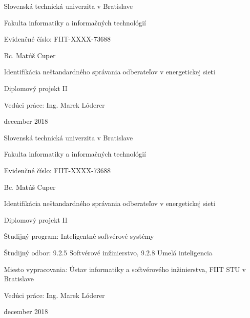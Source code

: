 \documentclass[a4paper,twoside,slovak,12pt,appendix]{article}
\begin{document}
\begin{titlepage}
	\centering
	{\Large Slovenská technická univerzita v Bratislave \par}
	{\Large Fakulta informatiky a informačných technológií \par}
  \vspace{0.5cm}
  {\normalsize Evidenčné číslo: FIIT-XXXX-73688 \par}
	\vspace{7cm}
  {\large Bc. Matúš Cuper \par}
  \vspace{0.5cm}
	{\LARGE Identifikácia neštandardného správania odberateľov v energetickej sieti \par}
	\vspace{0.5cm}
	{\large Diplomový projekt II \par}
	\vspace{7cm}
  \flushleft
	{\large Vedúci práce: Ing. Marek Lóderer \par}
  \vspace{0.5cm}
  {\large december 2018 \par}
	\vfill
\end{titlepage}

\begin{titlepage}
	\centering
  {\Large Slovenská technická univerzita v Bratislave \par}
	{\Large Fakulta informatiky a informačných technológií \par}
  \vspace{0.5cm}
  {\normalsize Evidenčné číslo: FIIT-XXXX-73688 \par}
	\vspace{7cm}
  {\large Bc. Matúš Cuper \par}
  \vspace{0.5cm}
	{\LARGE Identifikácia neštandardného správania odberateľov v energetickej sieti \par}
	\vspace{0.5cm}
	{\large Diplomový projekt II \\}
	\vspace{7cm}
  \flushleft
  {\normalsize Študijný program: Inteligentné softvérové systémy \par}
	{\normalsize Študijný odbor: 9.2.5 Softvérové inžinierstvo, 9.2.8 Umelá inteligencia \par}
	{\normalsize Miesto vypracovania: Ústav informatiky a softvérového inžinierstva, FIIT STU v Bratislave \par}
	{\normalsize Vedúci práce: Ing. Marek Lóderer \par}
  \vspace{0.5cm}
  {\normalsize december 2018 \par}
\end{titlepage}
\end{document}
